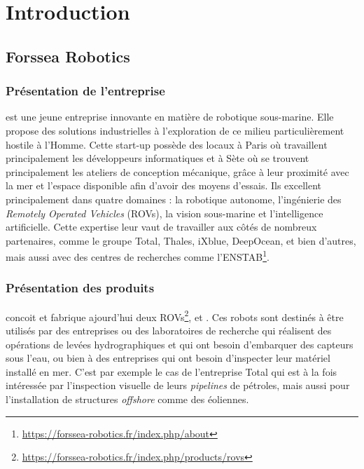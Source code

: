 \chapter{Introduction}
\label{chapter:introduction}
	
	\section{Forssea Robotics}

		\subsection{Présentation de l'entreprise}

			\forssea{} est une jeune entreprise innovante en matière de robotique sous-marine. Elle propose des solutions industrielles à l'exploration de ce milieu particulièrement hostile à l'Homme. Cette start-up possède des locaux à Paris où travaillent principalement les développeurs informatiques et à Sète où se trouvent principalement les ateliers de conception mécanique, grâce à leur proximité avec la mer et l'espace disponible afin d'avoir des moyens d'essais. Ils excellent principalement dans quatre domaines : la robotique autonome, l'ingénierie des \textit{Remotely Operated Vehicles} (\gls{ROV}s), la vision sous-marine et l'intelligence artificielle. Cette expertise leur vaut de travailler aux côtés de nombreux partenaires, comme le groupe Total, Thales, iXblue, DeepOcean, et bien d'autres, mais aussi avec des centres de recherches comme l'\gls{ENSTAB}\footnote{\url{https://forssea-robotics.fr/index.php/about}}.

		\subsection{Présentation des produits}

			\forssea{} concoit et fabrique ajourd'hui deux \gls{ROV}s\footnote{\url{https://forssea-robotics.fr/index.php/products/rovs}}, \argos{} et \atoll{}. Ces robots sont destinés à être utilisés par des entreprises ou des laboratoires de recherche qui réalisent des opérations de levées hydrographiques et qui ont besoin d'embarquer des capteurs sous l'eau, ou bien à des entreprises qui ont besoin d'inspecter leur matériel installé en mer. C'est par exemple le cas de l'entreprise Total qui est à la fois intéressée par l'inspection visuelle de leurs \textit{pipelines} de pétroles, mais aussi pour l'installation de structures \textit{offshore} comme des éoliennes.
			
